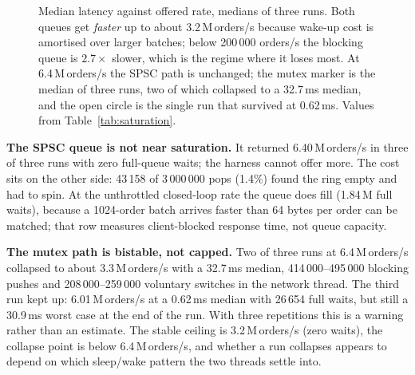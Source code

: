 \documentclass[conference]{IEEEtran}
\newcommand{\Mops}{\,M\,orders/s}
\begin{document}
\begin{figure}[!t]
\centering
{}
\caption{Median latency against offered rate, medians of three runs. Both
queues get \emph{faster} up to about 3.2\Mops{} because wake-up cost is
amortised over larger batches; below 200\,000 orders/s the blocking queue is
$2.7\times$ slower, which is the regime where it loses most. At 6.4\Mops{} the
SPSC path is unchanged; the mutex marker is the median of three runs, two of
which collapsed to a 32.7\,ms median, and the open circle is the single run that
survived at 0.62\,ms. Values from Table~\ref{tab:saturation}.}
\label{fig:sat}
\end{figure}

\textbf{The SPSC queue is not near saturation.} It returned 6.40\Mops{} in three
of three runs with zero full-queue waits; the harness cannot offer more. The cost
sits on the other side: 43\,158 of 3\,000\,000 pops (1.4\%) found the ring empty
and had to spin. At the unthrottled closed-loop rate the queue does fill
(1.84\,M full waits), because a 1024-order batch arrives faster than 64 bytes per
order can be matched; that row measures client-blocked response time, not queue
capacity.

\textbf{The mutex path is bistable, not capped.} Two of three runs at 6.4\Mops
collapsed to about 3.3\Mops{} with a 32.7\,ms median, 414\,000--495\,000 blocking
pushes and 208\,000--259\,000 voluntary switches in the network thread. The third
run kept up: 6.01\Mops{} at a 0.62\,ms median with 26\,654 full waits, but still
a 30.9\,ms worst case at the end of the run. With three repetitions this is a
warning rather than an estimate. The stable ceiling is 3.2\Mops{} (zero waits),
the collapse point is below 6.4\Mops, and whether a run collapses appears to
depend on which sleep/wake pattern the two threads settle into.
\end{document}
